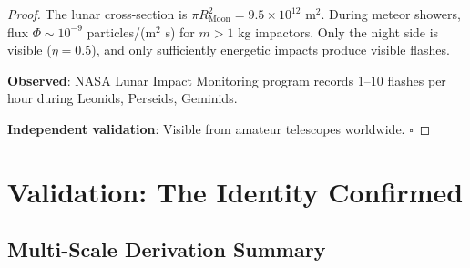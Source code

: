 \documentclass[twocolumn,10pt]{article}
\theoremstyle{definition}
\theoremstyle{remark}
\begin{document}
\begin{proof}
The lunar cross-section is $\pi R_{\text{Moon}}^2 = 9.5 \times 10^{12}$ m$^2$. During meteor showers, flux $\Phi \sim 10^{-9}$ particles/(m$^2$ s) for $m > 1$ kg impactors. Only the night side is visible ($\eta = 0.5$), and only sufficiently energetic impacts produce visible flashes.

\textbf{Observed}: NASA Lunar Impact Monitoring program records 1--10 flashes per hour during Leonids, Perseids, Geminids.

\textbf{Independent validation}: Visible from amateur telescopes worldwide. $\square$
\end{proof}

\section{Validation: The Identity Confirmed}
\label{sec:validation}

\subsection{Multi-Scale Derivation Summary}
\end{document}
